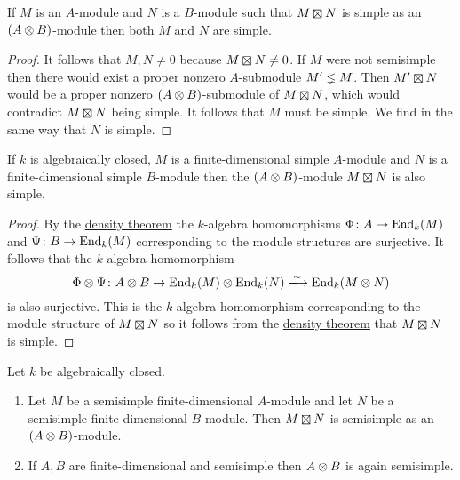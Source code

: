 \begin{lemma}
  \label{lemma: if product is simple then so are factors}
  If $M$ is an $A$-module and $N$ is a $B$-module such that $M \outertensor N$ is simple as an $(A \mathbin{\otimes} B)$-module then both $M$ and $N$ are simple.
\end{lemma}


\begin{proof}
  It follows that $M, N \neq 0$ because $M \outertensor N \neq 0$.
  If $M$ were not semisimple then there would exist a proper nonzero $A$-submodule $M' \lneq M$.
  Then $M' \outertensor N$ would be a proper nonzero $(A \mathbin{\otimes} B)$-submodule of $M \outertensor N$, which would contradict $M \outertensor N$ being simple.
  It follows that $M$ must be simple.
  We find in the same way that $N$ is simple.
\end{proof}


\begin{lemma}
  \label{lemma: tensor product of modules is again simple}
  If $k$ is algebraically closed, $M$ is a finite-dimensional simple $A$-module and $N$ is a finite-dimensional simple $B$-module then the $(A \mathbin{\otimes} B)$-module $M \outertensor N$ is also simple.
\end{lemma}


\begin{proof}
  By the \hyperref[theorem: density theorem]{density theorem} the $k$-algebra homomorphisms $\Phi \colon A \to \operatorname{End}_k(M)$ and $\Psi \colon B \to \operatorname{End}_k(M)$ corresponding to the module structures are surjective.
  It follows that the $k$-algebra homomorphism
  \[
                            \Phi \tensor \Psi
    \colon                  A \tensor B
    \to                     \End_k(M) \tensor \End_k(N)
    \xlongrightarrow{\sim}  \End_k(M \tensor N)
  \]
  is also surjective.
  This is the $k$-algebra homomorphism corresponding to the module structure of $M \outertensor N$ so it follows from the \hyperref[theorem: density theorem]{density theorem} that $M \outertensor N$ is simple.
\end{proof}




\begin{corollary}
  Let $k$ be algebraically closed.
  \begin{enumerate}
    \item
      \label{enumerate: outer tensor product of semisimple modules}
      Let $M$ be a semisimple finite-dimensional $A$-module and let $N$ be a semisimple finite-dimensional $B$-module.
      Then $M \outertensor N$ is semisimple as an $(A \mathbin{\otimes} B)$-module.
    \item
      If $A, B$ are finite-dimensional and semisimple then $A \mathbin{\otimes} B$ is again semisimple.
  \end{enumerate}
\end{corollary}


